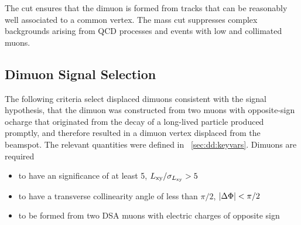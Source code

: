 The \vchisq cut ensures that the dimuon is formed from tracks that can be reasonably well associated to a common vertex.
The mass cut suppresses complex backgrounds arising from QCD processes and events with low \pT and collimated muons.

\subsection{Dimuon Signal Selection}
\label{sec:dd:DimuonSignal}
The following criteria select displaced dimuons consistent with the signal hypothesis, \ie that the dimuon was constructed from two muons with opposite-sign ocharge that originated from the decay of a long-lived particle produced promptly, and therefore resulted in a dimuon vertex displaced from the beamspot.
The relevant quantities were defined in \Sec~\ref{sec:dd:keyvars}.
Dimuons are required
\begin{itemize}
  \item to have an \Lxy significance of at least 5, \ie $L_{\mathrm{xy}}/\sigma_{L_{\mathrm{xy}}} > 5$
  \item to have a transverse collinearity angle of less than $\pi/2$, \ie $|\Delta\Phi| < \pi/2$
  \item to be formed from two DSA muons with electric charges of opposite sign
\end{itemize}

